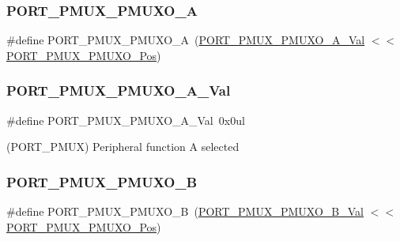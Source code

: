 \mbox{\label{group___s_a_m_d21___p_o_r_t_ga15add9b744cbeaf6bf9aa899e7a126b0}} 
\subsubsection{\texorpdfstring{PORT\_PMUX\_PMUXO\_A}{PORT\_PMUX\_PMUXO\_A}}
{\footnotesize\ttfamily \#define P\+O\+R\+T\+\_\+\+P\+M\+U\+X\+\_\+\+P\+M\+U\+X\+O\+\_\+A~(\mbox{\hyperlink{group___s_a_m_d21___p_o_r_t_gae64ac445d72b81e07bb7d3bf3613ed96}{P\+O\+R\+T\+\_\+\+P\+M\+U\+X\+\_\+\+P\+M\+U\+X\+O\+\_\+\+A\+\_\+\+Val}}         $<$$<$ \mbox{\hyperlink{group___s_a_m_d21___p_o_r_t_ga80a28619ad2db553b64d4ce4545368d3}{P\+O\+R\+T\+\_\+\+P\+M\+U\+X\+\_\+\+P\+M\+U\+X\+O\+\_\+\+Pos}})}

\mbox{\label{group___s_a_m_d21___p_o_r_t_gae64ac445d72b81e07bb7d3bf3613ed96}} 
\subsubsection{\texorpdfstring{PORT\_PMUX\_PMUXO\_A\_Val}{PORT\_PMUX\_PMUXO\_A\_Val}}
{\footnotesize\ttfamily \#define P\+O\+R\+T\+\_\+\+P\+M\+U\+X\+\_\+\+P\+M\+U\+X\+O\+\_\+\+A\+\_\+\+Val~0x0ul}



(P\+O\+R\+T\+\_\+\+P\+M\+UX) Peripheral function A selected 

\mbox{\label{group___s_a_m_d21___p_o_r_t_ga69fd67bf5fdd920953222862ce469a0c}} 
\subsubsection{\texorpdfstring{PORT\_PMUX\_PMUXO\_B}{PORT\_PMUX\_PMUXO\_B}}
{\footnotesize\ttfamily \#define P\+O\+R\+T\+\_\+\+P\+M\+U\+X\+\_\+\+P\+M\+U\+X\+O\+\_\+B~(\mbox{\hyperlink{group___s_a_m_d21___p_o_r_t_ga06b7e4be19fba8f8880387c1628470c3}{P\+O\+R\+T\+\_\+\+P\+M\+U\+X\+\_\+\+P\+M\+U\+X\+O\+\_\+\+B\+\_\+\+Val}}         $<$$<$ \mbox{\hyperlink{group___s_a_m_d21___p_o_r_t_ga80a28619ad2db553b64d4ce4545368d3}{P\+O\+R\+T\+\_\+\+P\+M\+U\+X\+\_\+\+P\+M\+U\+X\+O\+\_\+\+Pos}})}

